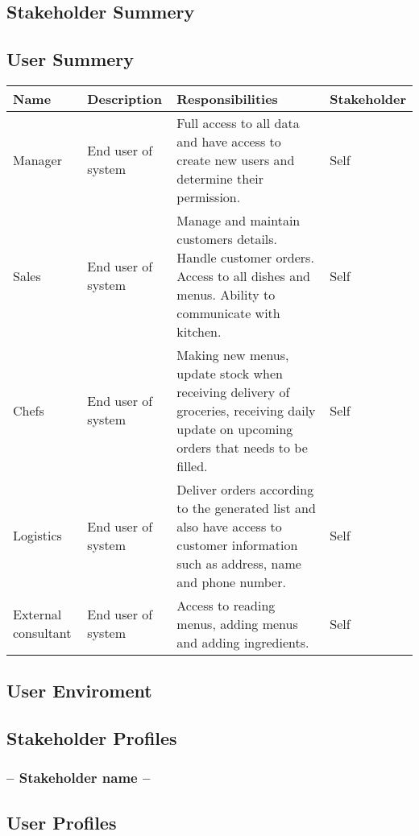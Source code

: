 \documentclass[12pt,norsk,a4paper]{article}
\begin{document}
\subsection{Stakeholder Summery}

\subsection{User Summery}
\begin{tabularx}{\textwidth}{llXX}
\toprule
\textbf{Name} & \textbf{Description} & \textbf{Responsibilities} & \textbf{Stakeholder} \\
\midrule
Manager & End user of system & Full access to all data and have access to create new users and
determine their         permission. & Self \\
\midrule
Sales & End user of system & Manage and maintain customers details. Handle customer orders.
Access to all dishes       and menus. Ability to communicate with kitchen. &Self \\
\midrule
Chefs & End user of system & Making new menus, update stock when receiving delivery of
groceries, receiving daily      update on upcoming orders that needs to be filled. & Self\\
\midrule
Logistics & End user of system & Deliver orders according to the generated list and also have
access to customer       information such as address, name and phone number. & Self\\
\midrule
External consultant & End user of system & Access to reading menus, adding menus and adding
ingredients. & Self \\
\bottomrule
\end{tabularx}


\subsection{User Enviroment}

\subsection{Stakeholder Profiles}

\subsubsection{-- Stakeholder name --}

\subsection{User Profiles}
\end{document}
